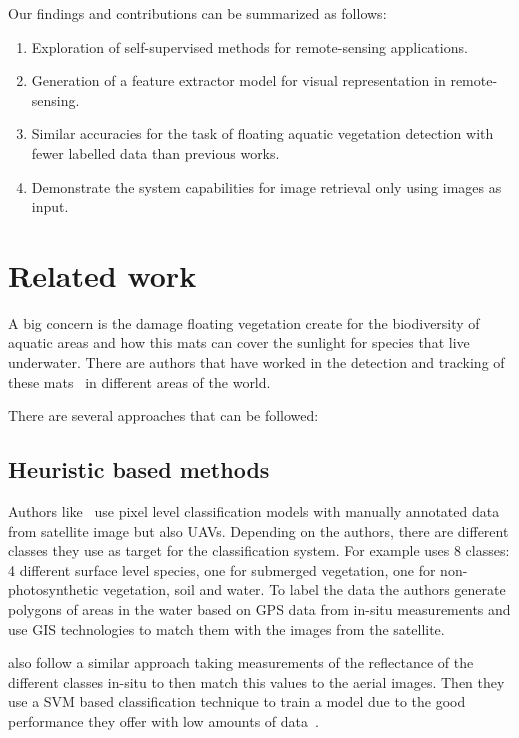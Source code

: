 \documentclass[conference]{IEEEtran}
\begin{document}
    Our findings and contributions can be summarized as follows:
    \begin{enumerate}
            \item Exploration of self-supervised methods for remote-sensing applications.
            \item Generation of a feature extractor model for visual representation in remote-sensing.
            \item Similar accuracies for the task of floating aquatic vegetation detection with fewer labelled data than previous works.
            \item Demonstrate the system capabilities for image retrieval only using images as input.
    \end{enumerate}


    \section{Related work}
    A big concern is the damage floating vegetation create for the biodiversity of aquatic areas and how this mats can cover the sunlight for species that live underwater.
    There are authors that have worked in the detection and tracking of these mats~\cite{donyana1, donyana2,rs14133013, srilanka_veg, 10.3389/fmars.2022.1004012} in different areas of the world.

    There are several approaches that can be followed:
    \subsection*{Heuristic based methods}

    Authors like~\citet{srilanka_veg, 10.3389/fmars.2022.1004012} use pixel level classification models with manually annotated data from satellite image but also UAVs.
    Depending on the authors, there are different classes they use as target for the classification system.
    For example \citet{rs14133013} uses 8 classes: 4 different surface level species, one for submerged vegetation, one for non-photosynthetic vegetation, soil and water.
    To label the data the authors generate polygons of areas in the water based on GPS data from in-situ measurements and use GIS technologies to match them with the images from the satellite.

    \citet{10.3389/fmars.2022.1004012} also follow a similar approach taking measurements of the reflectance of the different classes in-situ to then match this values to the aerial images.
    Then they use a SVM based classification technique to train a model due to the good performance they offer with low amounts of data~\cite{Cortes1995}.
\end{document}
